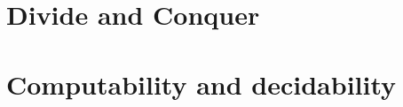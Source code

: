 









\tableofcontents
\newpage
{}





\chapter{Divide and Conquer}














\chapter{Computability and decidability}








